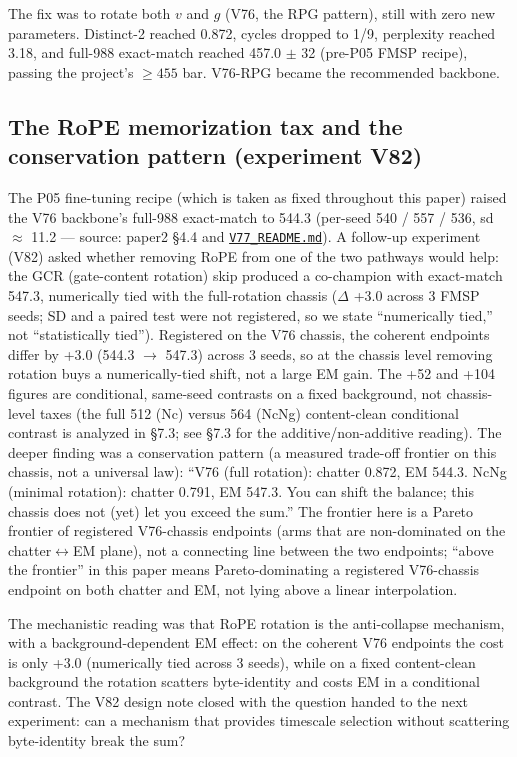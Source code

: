\documentclass[11pt]{article}
\begin{document}
The fix was to rotate both $v$ and $g$ (V76, the RPG pattern), still with zero new parameters. Distinct-2 reached 0.872, cycles dropped to 1/9, perplexity reached 3.18, and full-988 exact-match reached 457.0 $\pm$ 32 (pre-P05 FMSP recipe), passing the project's $\geq 455$ bar. V76-RPG became the recommended backbone.

\subsection{The RoPE memorization tax and the conservation pattern (experiment V82)}

The P05 fine-tuning recipe (which is taken as fixed throughout this paper) raised the V76 backbone's full-988 exact-match to 544.3 (per-seed 540 / 557 / 536, sd $\approx$ 11.2 --- source: paper2 \S4.4 and \href{https://github.com/llaa33219/MicroMixer-4/blob/4bb630413dfa58ef3141291e121ab8c006d03235/V77_README.md}{\texttt{V77\_README.md}}). A follow-up experiment (V82) asked whether removing RoPE from one of the two pathways would help: the GCR (gate-content rotation) skip produced a co-champion with exact-match 547.3, numerically tied with the full-rotation chassis ($\Delta$ +3.0 across 3 FMSP seeds; SD and a paired test were not registered, so we state ``numerically tied,'' not ``statistically tied''). Registered on the V76 chassis, the coherent endpoints differ by +3.0 (544.3 $\to$ 547.3) across 3 seeds, so at the chassis level removing rotation buys a numerically-tied shift, not a large EM gain. The +52 and +104 figures are conditional, same-seed contrasts on a fixed background, not chassis-level taxes (the full 512 (Nc) versus 564 (NcNg) content-clean conditional contrast is analyzed in \S7.3; see \S7.3 for the additive/non-additive reading). The deeper finding was a conservation pattern (a measured trade-off frontier on this chassis, not a universal law): ``V76 (full rotation): chatter 0.872, EM 544.3. NcNg (minimal rotation): chatter 0.791, EM 547.3. You can shift the balance; this chassis does not (yet) let you exceed the sum.'' The frontier here is a Pareto frontier of registered V76-chassis endpoints (arms that are non-dominated on the chatter$\leftrightarrow$EM plane), not a connecting line between the two endpoints; ``above the frontier'' in this paper means Pareto-dominating a registered V76-chassis endpoint on both chatter and EM, not lying above a linear interpolation.

The mechanistic reading was that RoPE rotation is the anti-collapse mechanism, with a background-dependent EM effect: on the coherent V76 endpoints the cost is only +3.0 (numerically tied across 3 seeds), while on a fixed content-clean background the rotation scatters byte-identity and costs EM in a conditional contrast. The V82 design note closed with the question handed to the next experiment: can a mechanism that provides timescale selection without scattering byte-identity break the sum?
\end{document}
